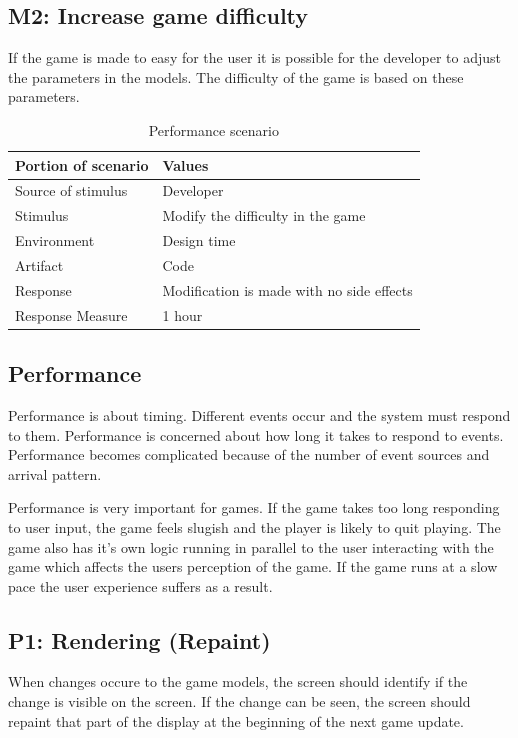 \subsection* {M2: Increase game difficulty}
If the game is made to easy for the user it is possible for the developer to adjust the
parameters in the models. The difficulty of the game is based on these parameters.

\begin{table}[H]
\begin{tabular}{| l | l |}
	\hline
	\rowcolor{gray}
	{\bf Portion of scenario} & {\bf Values} \\ \hline
	Source of stimulus & Developer\\ \hline
	Stimulus & Modify the difficulty in the game\\ \hline
	Environment & Design time \\ \hline
	Artifact & Code \\ \hline
	Response & Modification is made with no side effects\\ \hline
	Response Measure & 1 hour\\ \hline
\end{tabular}
\caption{Performance scenario}
\end{table}

\subsection{Performance}

Performance\cite{attributes} is about timing. Different events occur and the system must respond to them. Performance is concerned about how long it takes to respond to events. Performance becomes complicated because of the number of event sources and arrival pattern.

Performance is very important for games. If the game takes too long responding to user input, the game feels slugish and the player is likely to quit playing. The game also has it's own logic running in parallel to the user interacting with the game which affects the users perception of the game. If the game runs at a slow pace the user experience suffers as a result.

\subsection*{P1: Rendering (Repaint)}
When changes occure to the game models, the screen should identify if the change 
is visible on the screen. If the change can be seen, the screen should repaint 
that part of the display at the beginning of the next game update.

